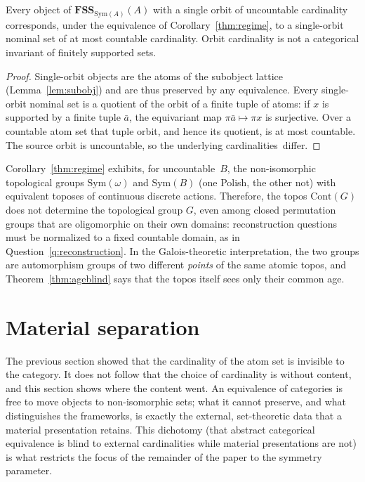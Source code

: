 \documentclass{lmcs}
\newcommand{\Sym}{\mathrm{Sym}}
\newcommand{\FSS}{\mathbf{FSS}}
\begin{document}
\begin{cor}\label{cor:orbitblind}
Every object of $\FSS_{\Sym(A)}(A)$ with a single orbit of uncountable cardinality corresponds, under the equivalence of Corollary~\ref{thm:regime}, to a single-orbit nominal set of at most countable cardinality. Orbit cardinality is not a categorical invariant of finitely supported sets.
\end{cor}
\begin{proof}
Single-orbit objects are the atoms of the subobject lattice
(Lemma~\ref{lem:subobj}) and are thus preserved by any
equivalence. Every single-orbit nominal set is a quotient of the
orbit of a finite tuple of atoms: if $x$ is supported by a finite tuple
$\bar a$, the equivariant map $\pi\bar a\mapsto\pi x$ is surjective.
Over a countable atom set that tuple orbit, and hence its quotient, is
at most countable. The source orbit is uncountable, so the underlying
cardinalities~differ.
\end{proof}

\begin{rem}\label{rem:reconfail}
Corollary~\ref{thm:regime} exhibits, for uncountable~$B$, the
non-isomorphic topological groups $\Sym(\omega)$ and $\Sym(B)$ (one
Polish, the other not) with equivalent toposes of continuous discrete
actions. Therefore, the topos $\mathrm{Cont}(G)$ does not determine the
topological group $G$, even among closed permutation groups that are
oligomorphic on their own domains: reconstruction questions must be
normalized to a fixed countable domain, as in Question~\ref{q:reconstruction}. In the Galois-theoretic interpretation, the
two groups are automorphism groups of two different \emph{points} of the same atomic topos, and Theorem~\ref{thm:ageblind} says that the topos itself sees only their common age.
\end{rem}

\section{Material separation}\label{sec:material}

The previous section showed that the cardinality of the atom set is invisible to the category. It does not follow that the choice of cardinality is without content, and this section shows where the content went. An equivalence of categories is free to move objects to non-isomorphic sets; what it cannot preserve, and what distinguishes the frameworks, is exactly the external, set-theoretic data that a material presentation retains.
This dichotomy (that abstract categorical equivalence is blind to external cardinalities while material presentations are not) is what restricts the focus of the remainder of the paper to the symmetry parameter.
\end{document}
